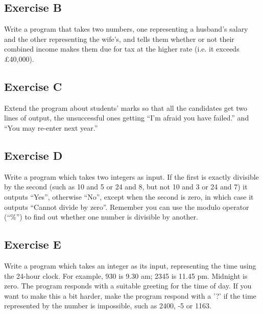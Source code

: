 
\subsection*{Exercise B}

Write a program that takes two numbers, one representing a
husband's salary and the other representing the wife's, and tells them
whether or not their combined income makes them due for tax at the higher rate
(i.e. it exceeds \pounds 40,000).

\subsection*{Exercise C}

Extend the program about students' marks so that all the candidates
get two lines of output, the unsuccessful ones getting ``I'm afraid you
have failed.'' and ``You may re-enter next year.''

\subsection*{Exercise D}

Write a program which takes two integers as input.
If the first is exactly divisible
by the second (such as 10 and 5 or 24 and 8, but not 10 and 3 or 24 and 7)
it outputs ``Yes'', otherwise ``No'', except when the second
is zero, in which case it outputs ``Cannot divide by zero''. Remember
you can use the modulo operator (``\%'') to find out whether one
number is divisible by another. 

\subsection*{Exercise E}

Write a program which takes an integer as its input, representing the time
using the 24-hour clock.  For example, 930 is 9.30 am; 2345 is 11.45 pm.  Midnight is
zero. The program responds with a suitable greeting for the time of day.
If you want to make this a bit harder, make the program respond with a '?'
if the time represented by the number is impossible, such as 2400, -5 or
1163.





